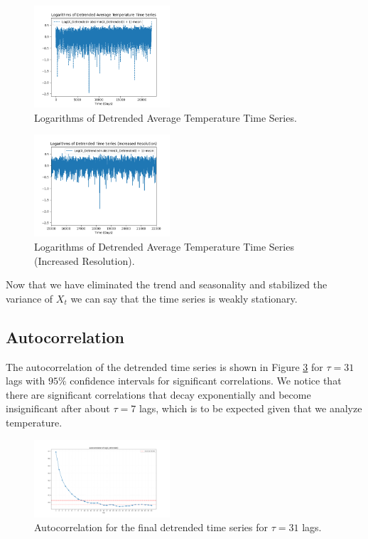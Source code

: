 \documentclass[conference]{IEEEtran}
\begin{document}
\begin{figure}[ht]
    \centering
    \includegraphics[width=0.45\textwidth]{Figures/GlasnevinLin/Logarithms of Detrended Average Temperature Time Series.png}
    \caption{Logarithms of Detrended Average Temperature Time Series.}
    \label{logfing}
\end{figure}

\begin{figure}[ht]
    \centering
    \includegraphics[width=0.45\textwidth]{Figures/GlasnevinLin/Logarithms of Detrended Time Series (Increased Resolution).png}
    \caption{Logarithms of Detrended Average Temperature Time Series (Increased Resolution).}
    \label{logfinzoomg}
\end{figure}

Now that we have eliminated the trend and seasonality and stabilized the variance of $X_t$ we can say that the time series is weakly stationary.

\subsection{Autocorrelation}

The autocorrelation of the detrended time series is shown in Figure \ref{airfddtg} for $\tau = 31$ lags with $95\%$ confidence intervals for significant correlations. We notice that there are significant correlations that decay exponentially and become insignificant after about $\tau = 7$ lags, which is to be expected given that we analyze temperature.

\begin{figure}[ht]
    \centering
    \includegraphics[width=0.45\textwidth]{Figures/GlasnevinLin/Autocorrelation of log(X_detrended).png}
    \caption{Autocorrelation for the final detrended time series for $\tau = 31$ lags.}
    \label{airfddtg}
\end{figure}
\end{document}
